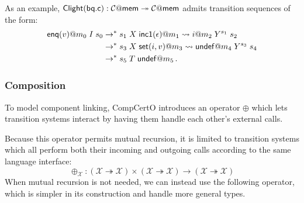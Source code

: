 \documentclass[acmsmall,review,anonymous]{acmart}\settopmatter{printfolios=true,printccs=false,printacmref=false}
\newcommand{\ISpec}{\mathbf{ISpec}}
\begin{document}
As an example,
$
  \mathsf{Clight} ( \mathsf{bq.c} ) :
 \mathcal{C}@ \mathsf{mem}  \twoheadrightarrow \mathcal{C}@ \mathsf{mem} 
$
admits transition sequences of the form:
\begin{align*}
   \mathsf{enq} (v)@m_0 \mathrel{I}
  s_0 &\rightarrow^*
  s_1 \mathrel{X}
   \mathsf{inc1} (\epsilon)@m_1 \leadsto
  i@m_2 \mathrel{Y^{s_1}}
  s_2 \\&\rightarrow^*
  s_3 \mathrel{X}
   \mathsf{set} (i, v)@m_3 \leadsto
   \mathsf{undef} @m_4 \mathrel{Y^{s_3}}
  s_4 \\&\rightarrow^*
  s_5 \mathrel{T}
   \mathsf{undef} @m_5
  \,.
\end{align*}

\subsubsection{Composition} %

To model component linking,
CompCertO introduces an operator $\oplus$
which lets transition systems interact
by having them handle each other's external calls.

Because this operator permits mutual recursion,
it is limited to transition systems which all perform
both their incoming and outgoing calls
according to the same language interface:
\[
  {\oplus_\mathcal{X}} :
    (\mathcal{X} \twoheadrightarrow \mathcal{X}) \times
    (\mathcal{X} \twoheadrightarrow \mathcal{X}) \rightarrow
    (\mathcal{X} \twoheadrightarrow \mathcal{X})
\]
When mutual recursion is not needed,
we can instead use the following operator,
which is simpler in its construction
and handle more general types.

\end{document}
